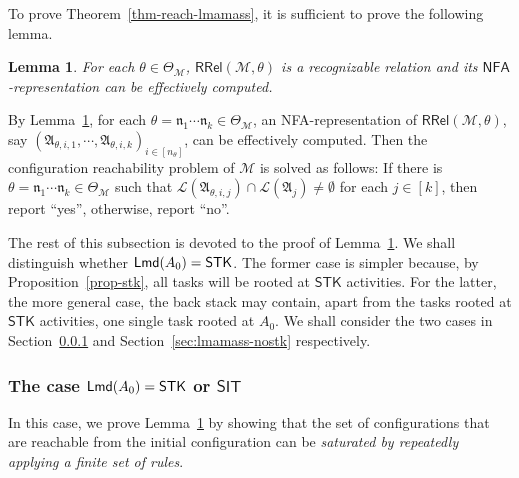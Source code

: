 \documentclass[preprint,12pt]{elsarticle}
\newtheorem{lemma}[theorem]{Lemma}
\newcommand\Mm{{\mathcal{M} }}
\newcommand\lmd{{\sf Lmd}}
\newcommand\conf{{\mathsf{Conf} }}
\newcommand\aname{\mathfrak{n}}
\newcommand\RLang{\mathsf{RRel}}
\newcommand{\STK}{\mathsf{STK}}
\newcommand{\SIT}{\mathsf{SIT}}
\newcommand\Aut{{\mathfrak{A} }}
\newcommand\Lang{{\mathscr{L} }}
\newcommand\ConfSet{{\mathscr{C} }}
\newcommand{\WOTrNFA}{\textsf{WPOTrNFA}}
\newcommand{\NFA}{\textsf{NFA}}
\begin{document}
To prove Theorem~\ref{thm-reach-lmamass}, it is sufficient to prove the following lemma. 
\begin{lemma}\label{lem:iff-recog}
    For each $\theta \in \Theta_\Mm$, $\RLang(\Mm, \theta)$ is a recognizable relation and its $\NFA$-representation can be effectively computed.
\end{lemma} 

By Lemma~\ref{lem:iff-recog}, for each $\theta = \aname_1 \cdots \aname_k \in \Theta_\Mm$, an {\NFA}-representation of $\RLang(\Mm, \theta)$, say $(\Aut_{\theta, i,1},\cdots,\Aut_{\theta, i,k})_{i \in [n_\theta]}$, can be effectively computed. 
Then the configuration reachability problem of $\Mm$ is solved as follows: If there is $\theta =  \aname_1 \cdots \aname_k \in \Theta_\Mm$ such that $\Lang(\Aut_{\theta, i, j}) \cap \Lang(\Aut_j) \neq \emptyset$ for each $j \in [k]$, then report ``yes'', otherwise, report ``no''.

The rest of this subsection is devoted to the proof of Lemma~\ref{lem:iff-recog}. We shall distinguish whether $\lmd(A_0) = \STK$. 
The former case is simpler because, by Proposition~\ref{prop-stk}, all tasks will be rooted at $\STK$ activities. For the latter, the more general case, the back stack may contain, apart from the tasks rooted at $\STK$ activities, one single task rooted at $A_0$. 
We shall consider the two cases in Section~\ref{sec:lmamass-stk} and Section~\ref{sec:lmamass-nostk} respectively.



\subsubsection{The case $\lmd(A_0) = \STK$ or $\SIT$}\label{sec:lmamass-stk}

In this case, we prove Lemma~\ref{lem:iff-recog} by showing that the set of configurations that are reachable from the initial configuration can be \emph{saturated by repeatedly applying a finite set of rules}. 
\end{document}
